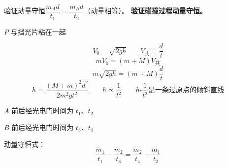 验证动量守恒\quad $\dfrac{m_Ad}{t_1}=\dfrac{m_Bd}{t_2}$（动量相等）。
\textbf{验证碰撞过程动量守恒。}


$P$ 与挡光片粘在一起

\[ V_0=\sqrt{2gh}\qquad V_{\text{共}}=\frac{d}{t} \]
\[ mV_0=(m+M)V_{\text{共}} \]
\[ m\sqrt{2gh}=(m+M)\frac{d}{t} \]
\[ h=\frac{(M+m)^2d^2}{2m^2gt^2}\qquad h\propto\frac{1}{t^2}\qquad h\text{-}\frac{1}{t^2}\text{是一条过原点的倾斜直线} \]

$A$ 前后经光电门时间为 $t_1$、$t_2$

$B$ 前后经光电门时间为 $t_3$、$t_4$

动量守恒式：
\[ \frac{m_1}{t_1}-\frac{m_2}{t_3}=\frac{m_2}{t_4}-\frac{m_1}{t_2} \]

